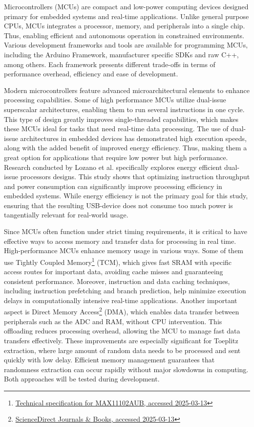 \documentclass{sigchi}
\begin{document}
Microcontrollers (MCUs) are compact and low-power computing devices designed primary for embedded systems and real-time applications. Unlike general purpose CPUs, MCUs integrates a processor, memory, and peripherals into a single chip. Thus, enabling efficient and autonomous operation in constrained environments. Various development frameworks and tools are available for programming MCUs, including the Arduino Framework, manufacturer specific SDKs and raw C++, among others. Each framework presents different trade-offs in terms of performance overhead, efficiency and ease of development.

Modern microcontrollers feature advanced microarchitectural elements to enhance processing capabilities. Some of high performance MCUs utilize dual-issue superscalar architectures, enabling them to run several instructions in one cycle. This type of design greatly improves single-threaded capabilities, which makes these MCUs ideal for tasks that need real-time data processing. The use of dual-issue architectures in embedded devices has demonstrated high execution speeds, along with the added benefit of improved energy efficiency. Thus, making them a great option for applications that require low power but high performance. Research conducted by Lozano et al. \cite{dual-issue} specifically explores energy efficient dual-issue processors designs. This study shows that optimizing instruction throughput and power consumption can significantly improve processing efficiency in embedded systems. While energy efficiency is not the primary goal for this study, ensuring that the resulting USB-device does not consume too much power is tangentially relevant for real-world usage.

Since MCUs often function under strict timing requirements, it is critical to have effective ways to access memory and transfer data for processing in real time. High-performance MCUs enhance memory usage in various ways. Some of them use Tightly Coupled Memory\footnote{\href{https://www.farnell.com/datasheets/1913106.pdf}{Technical specification for MAX11102AUB, accessed 2025-03-13}} (TCM), which gives fast SRAM with specific access routes for important data, avoiding cache misses and guaranteeing consistent performance. Moreover, instruction and data caching techniques, including instruction prefetching and branch prediction, help minimize execution delays in computationally intensive real-time applications. Another important aspect is Direct Memory Access\footnote{\href{https://www.sciencedirect.com/topics/computer-science/direct-memory-access}{ScienceDirect Journals \& Books, accessed 2025-03-13}} (DMA), which enables data transfer between peripherals such as the ADC and RAM, without CPU intervention. This offloading reduces processing overhead, allowing the MCU to manage fast data transfers effectively. These improvements are especially significant for Toeplitz extraction, where large amount of random data needs to be processed and sent quickly with low delay. Efficient memory management guarantees that randomness extraction can occur rapidly without major slowdowns in computing. Both approaches will be tested during development.
\end{document}
